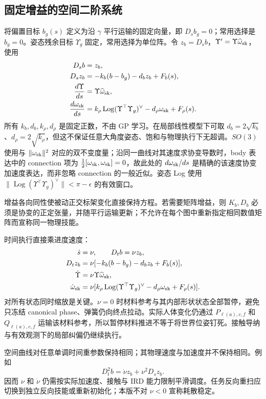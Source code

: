 \documentclass[11pt,a4paper]{article}
\numberwithin{equation}{section}
\theoremstyle{definition}
\begin{document}
\subsection{固定增益的空间二阶系统}
将偏置目标 $b_g(s)$ 定义为沿 $\gamma$ 平行运输的固定向量，即 $D_sb_g=0$；常用选择是 $b_g=0$。姿态残余目标 $\Upsilon_g$ 固定，常用选择为单位阵。令 $z_b=D_sb$，$\Upsilon'=\Upsilon\widehat\omega_{\rm sk}$，使用
\begin{align}
 D_sb&=z_b,\\
 D_sz_b&=-k_b(b-b_g)-d_bz_b+F_b(s),\\
 \frac{d\Upsilon}{ds}&=\Upsilon\widehat\omega_{\rm sk},\\
 \frac{d\omega_{\rm sk}}{ds}
 &=k_\rho\operatorname{Log}(\Upsilon^\top\Upsilon_g)^\vee
   -d_\rho\omega_{\rm sk}+F_\rho(s).
 \label{eq:v43-space-generator}
\end{align}
所有 $k_b,d_b,k_\rho,d_\rho$ 是固定正数，不由 GP 学习。在局部线性模型下可取 $d_b=2\sqrt{k_b}$、$d_\rho=2\sqrt{k_\rho}$，但这不保证任意大角度姿态、饱和与物理执行下无超调。$SO(3)$ 使用与 $\|\omega_{\rm sk}\|^2$ 对应的双不变度量；沿同一曲线对其速度求协变导数时，body 表达中的 connection 项为 $\tfrac12[\omega_{\rm sk},\omega_{\rm sk}]=0$，故此处的 $d\omega_{\rm sk}/ds$ 是精确的该速度协变加速度表达，而非忽略 connection 的一般近似。姿态 Log 使用 $\|\operatorname{Log}(\Upsilon^\top\Upsilon_g)^\vee\|<\pi-\epsilon$ 的有效窗口。

增益各向同性使被动正交标架变化直接保持方程。若需要矩阵增益，则 $K_b,D_b$ 必须是协变的正定张量，并随平行运输更新；不允许在每个图中重新指定相同数值矩阵而宣称同一物理技能。

时间执行直接乘进度速度：
\begin{align}
 \dot s&=\nu,\qquad D_tb=\nu z_b,\\
 D_tz_b&=\nu[-k_b(b-b_g)-d_bz_b+F_b(s)],\\
 \dot\Upsilon&=\nu\Upsilon\widehat\omega_{\rm sk},\\
 \dot\omega_{\rm sk}&=\nu[k_\rho\operatorname{Log}(\Upsilon^\top\Upsilon_g)^\vee
                    -d_\rho\omega_{\rm sk}+F_\rho(s)].
 \label{eq:v43-time-generator}
\end{align}
对所有状态同时缩放是关键。$\nu=0$ 时材料参考与其内部形状状态全部暂停，避免只冻结 canonical phase、弹簧仍向终点拉动。实际人体变化仍通过 $P_{\ell(a),c,f}$ 和 $Q_{\ell(a),c,f}$ 运输该材料参考，所以暂停材料推进不等于将世界位姿钉死。接触导纳与有效观测下的局部纠偏仍继续执行。

空间曲线对任意单调时间重参数保持相同；其物理速度与加速度并不保持相同。例如
\begin{equation}
 D_t^2 b=\dot\nu z_b+\nu^2D_sz_b.
 \label{eq:v43-time-acceleration}
\end{equation}
因而 $\nu$ 和 $\dot\nu$ 仍需按实际加速度、接触与 IRD 能力限制平滑调度。任务反向重扫应切换到独立反向技能或重新初始化；本版不对 $\nu<0$ 宣称耗散稳定。
\end{document}
